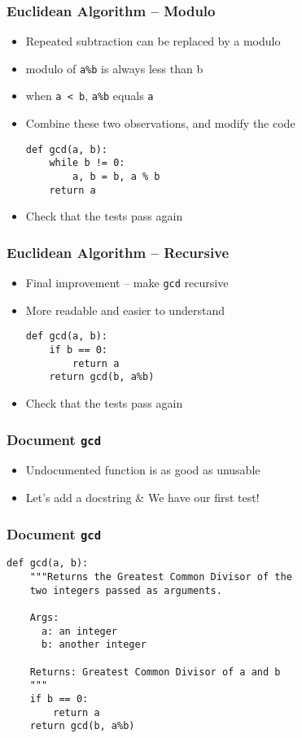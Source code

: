 \documentclass[14pt,compress]{beamer}
\begin{document}
\begin{frame}[fragile]
  \frametitle{Euclidean Algorithm -- Modulo}
  \begin{itemize}
  \item Repeated subtraction can be replaced by a modulo
  \item modulo of \texttt{a\%b} is always less than b
  \item when \texttt{a < b}, \texttt{a\%b} equals \texttt{a}
  \item Combine these two observations, and modify the code
\begin{lstlisting}
def gcd(a, b):
    while b != 0:
        a, b = b, a % b
    return a
\end{lstlisting}
  \item Check that the tests pass again
  \end{itemize}
\end{frame}

\begin{frame}[fragile]
  \frametitle{Euclidean Algorithm -- Recursive}
  \begin{itemize}
  \item Final improvement -- make \texttt{gcd} recursive
  \item More readable and easier to understand
\begin{lstlisting}
def gcd(a, b):
    if b == 0:
        return a
    return gcd(b, a%b)
\end{lstlisting}
  \item Check that the tests pass again
  \end{itemize}
\end{frame}

\begin{frame}[fragile]
  \frametitle{Document \texttt{gcd}}
  \begin{itemize}
  \item Undocumented function is as good as unusable
  \item Let's add a docstring \& We have our first test!
  \end{itemize}
\end{frame}
\begin{frame}[fragile]
  \frametitle{Document \texttt{gcd}}
\small
\begin{lstlisting}
def gcd(a, b):
    """Returns the Greatest Common Divisor of the
    two integers passed as arguments.

    Args:
      a: an integer
      b: another integer

    Returns: Greatest Common Divisor of a and b
    """
    if b == 0:
        return a
    return gcd(b, a%b)
\end{lstlisting}
\end{frame}
\end{document}
